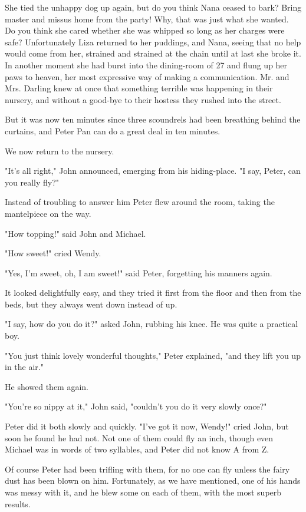 She tied the unhappy dog up again, but do you think Nana ceased to bark?
Bring master and missus home from the party! Why, that was just what she
wanted. Do you think she cared whether she was whipped so long as her
charges were safe? Unfortunately Liza returned to her puddings, and Nana,
seeing that no help would come from her, strained and strained at the
chain until at last she broke it. In another moment she had burst into the
dining-room of 27 and flung up her paws to heaven, her most expressive way
of making a communication. Mr. and Mrs. Darling knew at once that
something terrible was happening in their nursery, and without a good-bye
to their hostess they rushed into the street.


But it was now ten minutes since three scoundrels had been breathing
behind the curtains, and Peter Pan can do a great deal in ten minutes.


We now return to the nursery.


"It's all right," John announced, emerging from his hiding-place. "I say,
Peter, can you really fly?"


Instead of troubling to answer him Peter flew around the room, taking the
mantelpiece on the way.


"How topping!" said John and Michael.


"How sweet!" cried Wendy.


"Yes, I'm sweet, oh, I am sweet!" said Peter, forgetting his manners
again.


It looked delightfully easy, and they tried it first from the floor and
then from the beds, but they always went down instead of up.


"I say, how do you do it?" asked John, rubbing his knee. He was quite a
practical boy.


"You just think lovely wonderful thoughts," Peter explained, "and they
lift you up in the air."


He showed them again.


"You're so nippy at it," John said, "couldn't you do it very slowly once?"


Peter did it both slowly and quickly. "I've got it now, Wendy!" cried
John, but soon he found he had not. Not one of them could fly an inch,
though even Michael was in words of two syllables, and Peter did not know
A from Z.


Of course Peter had been trifling with them, for no one can fly unless the
fairy dust has been blown on him. Fortunately, as we have mentioned, one
of his hands was messy with it, and he blew some on each of them, with the
most superb results.


